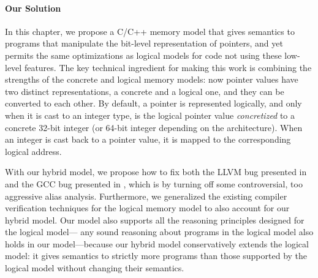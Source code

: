 

\paragraph{Our Solution}

In this chapter, we propose a C/C++ memory model that gives semantics to programs that manipulate
the bit-level representation of pointers, and yet permits the same optimizations as logical models
for code not using these low-level features.  The key technical ingredient for making this work is
combining the strengths of the concrete and logical memory models: now pointer values have two
distinct representations, a concrete and a logical one, and they can be converted to each other.  By
default, a pointer is represented logically, and only when it is cast to an integer type, is the
logical pointer value \emph{concretized} to a concrete 32-bit integer (or 64-bit integer depending
on the architecture).  When an integer is cast back to a pointer value, it is mapped to the
corresponding logical address.



With our hybrid model, we propose how to fix both the LLVM bug presented in
 and the GCC bug presented in ,
which is by turning off some controversial, too aggressive alias analysis.  Furthermore, we
generalized the existing compiler verification techniques for the logical memory model to also
account for our hybrid model.  Our model also supports all the reasoning principles designed for the
logical model---\ie{} any sound reasoning about programs in the logical model also holds in our
model---because our hybrid model conservatively extends the logical model: it gives semantics to
strictly more programs than those supported by the logical model without changing their semantics.


